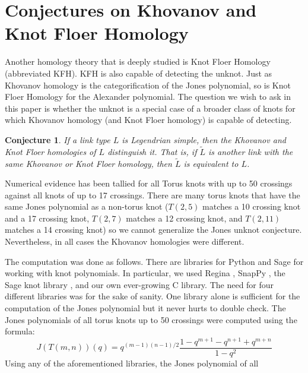 \documentclass{article}
\theoremstyle{plain}
\newtheorem{conjecture}{Conjecture}
\begin{document}
    \section{Conjectures on Khovanov and Knot Floer Homology}
        Another homology theory that is deeply studied is Knot Floer Homology
        (abbreviated KFH). KFH is also capable of detecting the unknot. Just as
        Khovanov homology is the categorification of the Jones polynomial, so
        is Knot Floer Homology for the Alexander polynomial.
        The question we wish to ask in this paper is whether the unknot is
        a special case of a broader class of knots for which Khovanov homology
        (and Knot Floer homology) is capable of detecting.
        \begin{conjecture}
            If a link type $L$ is Legendrian simple, then the Khovanov and Knot
            Floer homologies of $L$ distinguish it. That is, if $\tilde{L}$
            is another link with the same Khovanov or Knot Floer homology,
            then $\tilde{L}$ is equivalent to $L$.
        \end{conjecture}
        Numerical evidence has been tallied for all Torus knots with up to 50
        crossings against all knots of up to 17 crossings. There are many
        torus knots that have the same Jones polynomial as a non-torus knot
        ($T(2,5)$ matches a 10 crossing knot and a 17 crossing knot, $T(2,7)$
        matches a 12 crossing knot, and $T(2,11)$ matches a 14 crossing knot)
        so we cannot generalize the Jones unknot conjecture. Nevertheless, in
        all cases the Khovanov homologies were different.
        \par\hfill\par
        The computation was done as follows. There are libraries for Python and
        Sage for working with knot polynomials. In particular, we used
        Regina \cite{regina}, SnapPy \cite{SnapPy}, the Sage knot library
        \cite{sage}, and our own ever-growing C library. The need for four
        different libraries was for the sake of sanity. One library alone is
        sufficient for the computation of the Jones polynomial but it never
        hurts to double check. The Jones polynomials of all torus knots up to
        50 crossings were computed using the formula:
        \begin{equation}
            J(T(m,n))(q)=q^{(m-1)(n-1)/2}
                \frac{1-q^{m+1}-q^{n+1}+q^{m+n}}{1-q^{2}}
        \end{equation}
        Using any of the aforementioned libraries, the Jones polynomial of all
\end{document}
